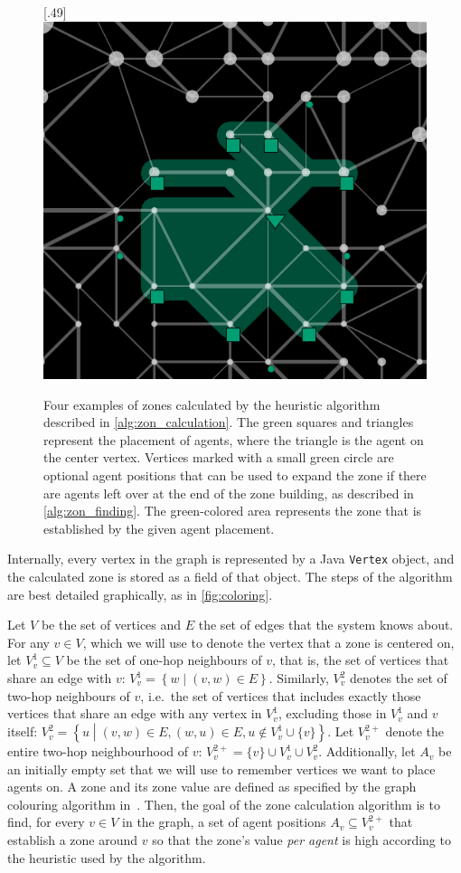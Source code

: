 \begin{figure}
  [.49\linewidth]{\includegraphics[width=.49\linewidth]{images/zone4.png}}
  \caption{Four examples of zones calculated by the heuristic algorithm described in \autoref{alg:zon_calculation}.
           The green squares and triangles represent the placement of agents, where the triangle is the agent on the center vertex.
           Vertices marked with a small green circle are optional agent positions that can be used to expand the zone if there are agents left over at the end of the zone building, as described in \autoref{alg:zon_finding}.
           The green-colored area represents the zone that is established by the given agent placement.}
  \label{fig:zones}
\end{figure}
Internally, every vertex in the graph is represented by a Java \lstinline{Vertex} object, and the calculated zone is stored as a field of that object.
The steps of the algorithm are best detailed graphically, as in \autoref{fig:coloring}.
\begin{definition}
  Let $V$ be the set of vertices and $E$ the set of edges that the system knows about.
  For any $v \in V$, which we will use to denote the vertex that a zone is centered on, let $V_v^1 \subseteq V$ be the set of one-hop neighbours of $v$, that is, the set of vertices that share an edge with $v$: $V_v^1= \left\{w \middle|\left(v,w \right ) \in E\right\}$.
  Similarly, $V_v^2$ denotes the set of two-hop neighbours of $v$, i.e.\ the set of vertices that includes exactly those vertices that share an edge with any vertex in $V_v^1$, excluding those in $V_v^1$ and $v$ itself: $V_v^2= \left\{u \middle|\left(v,w \right ) \in E, \left(w,u \right ) \in E, u \notin V_v^1\cup\{v\}\right\}$.
  Let $V_v^{2+}$ denote the entire two-hop neighbourhood of $v$: $V_{v}^{2+} = \{v\} \cup V_v^1 \cup V_v^2$.
  Additionally, let $A_v$ be an initially empty set that we will use to remember vertices we want to place agents on.
  A zone and its zone value are defined as specified by the graph colouring algorithm in~\cite{ahlbrecht_mapc_2014}.
  Then, the goal of the zone calculation algorithm is to find, for every $v \in V$ in the graph, a set of agent positions $A_v \subseteq V_{v}^{2+}$ that establish a zone around $v$ so that the zone's value \emph{per agent} is high according to the heuristic used by the algorithm.
\end{definition}

